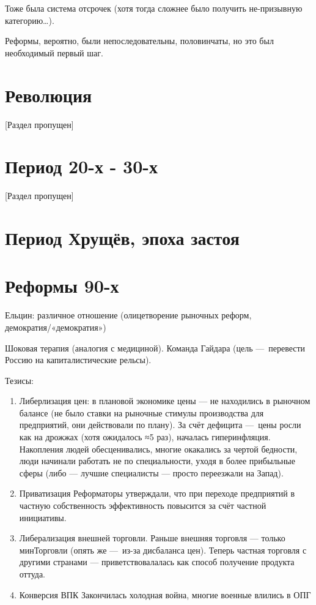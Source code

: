 \documentclass[12pt, a4paper]{article}
\begin{document}
Тоже была система отсрочек (хотя тогда сложнее было получить не-призывную категорию…).

Реформы, вероятно, были непоследовательны, половинчаты, но это был необходимый первый шаг.

\section{Революция}

[Раздел пропущен]

\section{Период 20-х - 30-х}

[Раздел пропущен]



\section{Период Хрущёв, эпоха застоя}

\section{Реформы 90-х}

Ельцин: различное отношение (олицетворение рыночных реформ, демократия/«демократия»)

Шоковая терапия (аналогия с медициной).
Команда Гайдара (цель — перевести Россию на капиталистические рельсы).

Тезисы:
\begin{enumerate}
    \item Либерлизация цен: в плановой экономике цены — не находились в рыночном балансе (не было ставки на рыночные стимулы производства для предприятий, они действовали по плану).
    За счёт дефицита — цены росли как на дрожжах (хотя ожидалось ≈5 раз), началась гиперинфляция.
    Накопления людей обесценивались, многие окакались за чертой бедности, люди начинали работать не по специальности, уходя в более прибыльные сферы (либо — лучшие специалисты — просто переезжали на Запад).
    \item Приватизация
    Реформаторы утверждали, что при переходе предприятий в частную собственность эффективность повысится за счёт частной инициативы.
    \item Либерализация внешней торговли. Раньше внешняя торговля — только минТорговли (опять же — из-за дисбаланса цен).
    Теперь частная торговля с другими странами — приветствовалалась как способ получение продукта оттуда.
    \item Конверсия ВПК
    Закончилась холодная война, многие военные влились в ОПГ
\end{enumerate}
\end{document}
